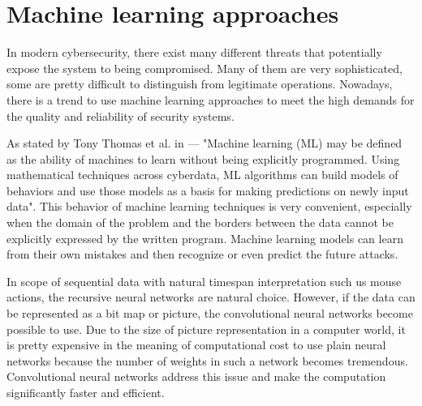 \section{Machine learning approaches}\label{sec:machine-learning-approaches}
In modern cybersecurity, there exist many different threats that potentially expose the system to being compromised.
Many of them are very sophisticated, some are pretty difficult to distinguish from legitimate operations.
Nowadays, there is a trend to use machine learning approaches to meet the high demands for the quality and reliability of security systems.

As stated by Tony Thomas et al. in \cite{thomas2020machine} --- "Machine learning (ML) may be defined as the ability of machines to learn without being explicitly programmed.
Using mathematical techniques across cyberdata, ML algorithms can build models of behaviors and use those models as a basis for making predictions on newly input data".
This behavior of machine learning techniques is very convenient, especially when the domain of the problem and the borders between the data cannot be explicitly expressed by the written program.
Machine learning models can learn from their own mistakes and then recognize or even predict the future attacks.

In scope of sequential data with natural timespan interpretation such us mouse actions, the recursive neural networks are natural choice.
However, if the data can be represented as a bit map or picture, the convolutional neural networks become possible to use.
Due to the size of picture representation in a computer world, it is pretty expensive in the meaning of computational cost to use plain neural networks because the number of weights in such a network becomes tremendous.
Convolutional neural networks address this issue and make the computation significantly faster and efficient.


